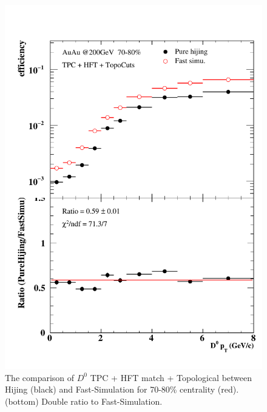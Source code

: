 \begin{figure}[htbp]
\begin{minipage}[htbp]{0.47\linewidth}
\centering
\includegraphics[width=1.0\textwidth,angle=0]{figure/Run14_D0HFT/70_80_2.pdf}
\caption{ The comparison of $D^0$ TPC + HFT match + Topological between Hijing (black) and Fast-Simulation for 70-80\% centrality (red). (bottom) Double ratio to Fast-Simulation.\label{70_80}}
\end{minipage}
\hfill
\begin{minipage}[htbp]{0.47\linewidth}
\centering

\end{minipage}
\end{figure}
